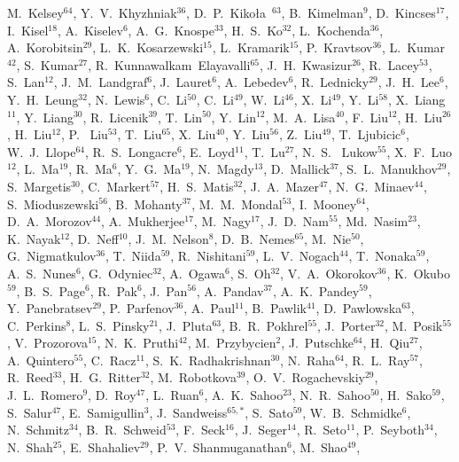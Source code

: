 {M.~Kelsey$^{64}$,
Y.~V.~Khyzhniak$^{36}$,
D.~P.~Kiko\l{}a~$^{63}$,
B.~Kimelman$^{9}$,
D.~Kincses$^{17}$,
I.~Kisel$^{18}$,
A.~Kiselev$^{6}$,
A.~G.~Knospe$^{33}$,
H.~S.~Ko$^{32}$,
L.~Kochenda$^{36}$,
A.~Korobitsin$^{29}$,
L.~K.~Kosarzewski$^{15}$,
L.~Kramarik$^{15}$,
P.~Kravtsov$^{36}$,
L.~Kumar$^{42}$,
S.~Kumar$^{27}$,
R.~Kunnawalkam~Elayavalli$^{65}$,
J.~H.~Kwasizur$^{26}$,
R.~Lacey$^{53}$,
S.~Lan$^{12}$,
J.~M.~Landgraf$^{6}$,
J.~Lauret$^{6}$,
A.~Lebedev$^{6}$,
R.~Lednicky$^{29}$,
J.~H.~Lee$^{6}$,
Y.~H.~Leung$^{32}$,
N.~Lewis$^{6}$,
C.~Li$^{50}$,
C.~Li$^{49}$,
W.~Li$^{46}$,
X.~Li$^{49}$,
Y.~Li$^{58}$,
X.~Liang$^{11}$,
Y.~Liang$^{30}$,
R.~Licenik$^{39}$,
T.~Lin$^{50}$,
Y.~Lin$^{12}$,
M.~A.~Lisa$^{40}$,
F.~Liu$^{12}$,
H.~Liu$^{26}$,
H.~Liu$^{12}$,
P.~ Liu$^{53}$,
T.~Liu$^{65}$,
X.~Liu$^{40}$,
Y.~Liu$^{56}$,
Z.~Liu$^{49}$,
T.~Ljubicic$^{6}$,
W.~J.~Llope$^{64}$,
R.~S.~Longacre$^{6}$,
E.~Loyd$^{11}$,
T.~Lu$^{27}$,
N.~S.~ Lukow$^{55}$,
X.~F.~Luo$^{12}$,
L.~Ma$^{19}$,
R.~Ma$^{6}$,
Y.~G.~Ma$^{19}$,
N.~Magdy$^{13}$,
D.~Mallick$^{37}$,
S.~L.~Manukhov$^{29}$,
S.~Margetis$^{30}$,
C.~Markert$^{57}$,
H.~S.~Matis$^{32}$,
J.~A.~Mazer$^{47}$,
N.~G.~Minaev$^{44}$,
S.~Mioduszewski$^{56}$,
B.~Mohanty$^{37}$,
M.~M.~Mondal$^{53}$,
I.~Mooney$^{64}$,
D.~A.~Morozov$^{44}$,
A.~Mukherjee$^{17}$,
M.~Nagy$^{17}$,
J.~D.~Nam$^{55}$,
Md.~Nasim$^{23}$,
K.~Nayak$^{12}$,
D.~Neff$^{10}$,
J.~M.~Nelson$^{8}$,
D.~B.~Nemes$^{65}$,
M.~Nie$^{50}$,
G.~Nigmatkulov$^{36}$,
T.~Niida$^{59}$,
R.~Nishitani$^{59}$,
L.~V.~Nogach$^{44}$,
T.~Nonaka$^{59}$,
A.~S.~Nunes$^{6}$,
G.~Odyniec$^{32}$,
A.~Ogawa$^{6}$,
S.~Oh$^{32}$,
V.~A.~Okorokov$^{36}$,
K.~Okubo$^{59}$,
B.~S.~Page$^{6}$,
R.~Pak$^{6}$,
J.~Pan$^{56}$,
A.~Pandav$^{37}$,
A.~K.~Pandey$^{59}$,
Y.~Panebratsev$^{29}$,
P.~Parfenov$^{36}$,
A.~Paul$^{11}$,
B.~Pawlik$^{41}$,
D.~Pawlowska$^{63}$,
C.~Perkins$^{8}$,
L.~S.~Pinsky$^{21}$,
J.~Pluta$^{63}$,
B.~R.~Pokhrel$^{55}$,
J.~Porter$^{32}$,
M.~Posik$^{55}$,
V.~Prozorova$^{15}$,
N.~K.~Pruthi$^{42}$,
M.~Przybycien$^{2}$,
J.~Putschke$^{64}$,
H.~Qiu$^{27}$,
A.~Quintero$^{55}$,
C.~Racz$^{11}$,
S.~K.~Radhakrishnan$^{30}$,
N.~Raha$^{64}$,
R.~L.~Ray$^{57}$,
R.~Reed$^{33}$,
H.~G.~Ritter$^{32}$,
M.~Robotkova$^{39}$,
O.~V.~Rogachevskiy$^{29}$,
J.~L.~Romero$^{9}$,
D.~Roy$^{47}$,
L.~Ruan$^{6}$,
A.~K.~Sahoo$^{23}$,
N.~R.~Sahoo$^{50}$,
H.~Sako$^{59}$,
S.~Salur$^{47}$,
E.~Samigullin$^{3}$,
J.~Sandweiss$^{65,*}$,
S.~Sato$^{59}$,
W.~B.~Schmidke$^{6}$,
N.~Schmitz$^{34}$,
B.~R.~Schweid$^{53}$,
F.~Seck$^{16}$,
J.~Seger$^{14}$,
R.~Seto$^{11}$,
P.~Seyboth$^{34}$,
N.~Shah$^{25}$,
E.~Shahaliev$^{29}$,
P.~V.~Shanmuganathan$^{6}$,
M.~Shao$^{49}$,
}
